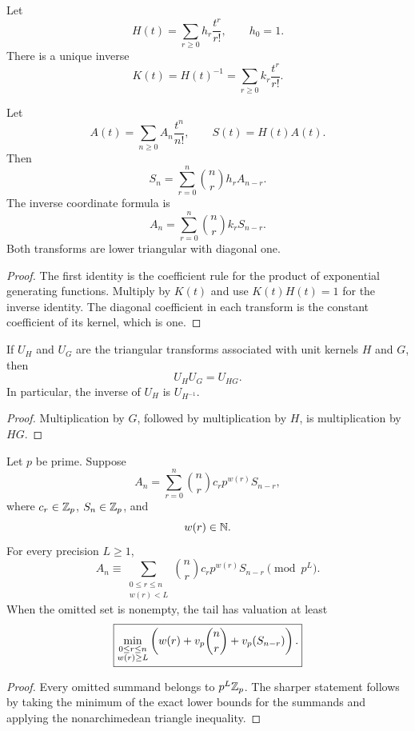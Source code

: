 Let
\[
H(t)=\sum_{r\geq0}h_r\frac{t^r}{r!},
\qquad
h_0=1.
\]
There is a unique inverse
\[
K(t)=H(t)^{-1}
=\sum_{r\geq0}k_r\frac{t^r}{r!}.
\]

\begin{histtheorem}\label{hist:thm:exact_coefficient_transport}
Let
\[
A(t)=\sum_{n\geq0}A_n\frac{t^n}{n!},
\qquad
S(t)=H(t)A(t).
\]
Then
\[
\boxed{
S_n
=
\sum_{r=0}^{n}
\binom nr h_rA_{n-r}.
}
\]
The inverse coordinate formula is
\[
\boxed{
A_n
=
\sum_{r=0}^{n}
\binom nr k_rS_{n-r}.
}
\]
Both transforms are lower triangular with diagonal one.
\end{histtheorem}

\begin{proof}
The first identity is the coefficient rule for the product of exponential generating functions. Multiply by \(K(t)\) and use \(K(t)H(t)=1\) for the inverse identity. The diagonal coefficient in each transform is the constant coefficient of its kernel, which is one.
\end{proof}

\begin{histcorollary}\label{hist:cor:transport_composition}
If \(U_H\) and \(U_G\) are the triangular transforms associated with unit kernels \(H\) and \(G\), then
\[
\boxed{
U_HU_G=U_{HG}.
}
\]
In particular, the inverse of \(U_H\) is \(U_{H^{-1}}\).
\end{histcorollary}

\begin{proof}
Multiplication by \(G\), followed by multiplication by \(H\), is multiplication by \(HG\).
\end{proof}

\begin{histtheorem}\label{hist:thm:filtered_triangular_reconstruction}
Let \(p\) be prime. Suppose
\[
A_n
=
\sum_{r=0}^{n}
\binom nr
c_rp^{w(r)}S_{n-r},
\]
where \(c_r\in\mathbb Z_p\), \(S_n\in\mathbb Z_p\), and
\[
w(r)\in\mathbb N.
\]
For every precision \(L\geq1\),
\[
\boxed{
A_n
\equiv
\sum_{\substack{0\leq r\leq n\\w(r)<L}}
\binom nr
c_rp^{w(r)}S_{n-r}
\pmod {p^L}.
}
\]
When the omitted set is nonempty, the tail has valuation at least
\[
\boxed{
\min_{\substack{0\leq r\leq n\\w(r)\geq L}}
\left(
w(r)+v_p\binom nr+v_p(S_{n-r})
\right).
}
\]
\end{histtheorem}

\begin{proof}
Every omitted summand belongs to \(p^L\mathbb Z_p\). The sharper statement follows by taking the minimum of the exact lower bounds for the summands and applying the nonarchimedean triangle inequality.
\end{proof}

